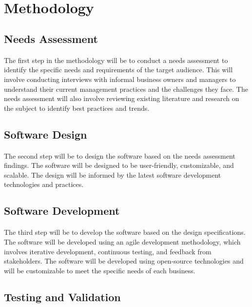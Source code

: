 \documentclass{article}
\begin{document}
\section{Methodology}
\subsection{Needs Assessment}
\paragraph*{}
The first step in the methodology will be to conduct a needs assessment to identify the specific needs and requirements of the target audience. This will involve conducting interviews with informal business owners and managers to understand their current management practices and the challenges they face. The needs assessment will also involve reviewing existing literature and research on the subject to identify best practices and trends.

\subsection{Software Design}
\paragraph*{}
The second step will be to design the software based on the needs assessment findings. The software will be designed to be user-friendly, customizable, and scalable. The design will be informed by the latest software development technologies and practices.

\subsection{Software Development}
\paragraph*{}
The third step will be to develop the software based on the design specifications. The software will be developed using an agile development methodology, which involves iterative development, continuous testing, and feedback from stakeholders. The software will be developed using open-source technologies and will be customizable to meet the specific needs of each business.

\subsection{Testing and Validation}
\end{document}
